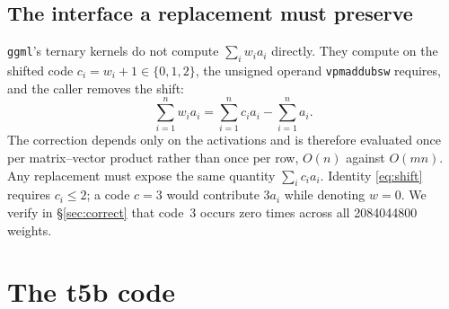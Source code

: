 \documentclass[11pt,a4paper]{article}
\newcommand{\code}[1]{\texttt{#1}}
\begin{document}
\subsection{The interface a replacement must preserve}
\code{ggml}'s ternary kernels do not compute $\sum_i w_ia_i$ directly. They
compute on the shifted code $c_i=w_i+1\in\{0,1,2\}$, the unsigned operand
\code{vpmaddubsw} requires, and the caller removes the shift:
\begin{equation}
\sum_{i=1}^{n}w_ia_i=\sum_{i=1}^{n}c_ia_i-\sum_{i=1}^{n}a_i .
\label{eq:shift}
\end{equation}
The correction depends only on the activations and is therefore evaluated once
per matrix--vector product rather than once per row, $O(n)$ against $O(mn)$. Any
replacement must expose the same quantity $\sum_i c_i a_i$. Identity
\eqref{eq:shift} requires $c_i\le 2$; a code $c=3$ would contribute $3a_i$ while
denoting $w=0$. We verify in \S\ref{sec:correct} that code~3 occurs zero times
across all \num{2084044800} weights.

\section{The t5b code}\label{sec:format}
\end{document}

